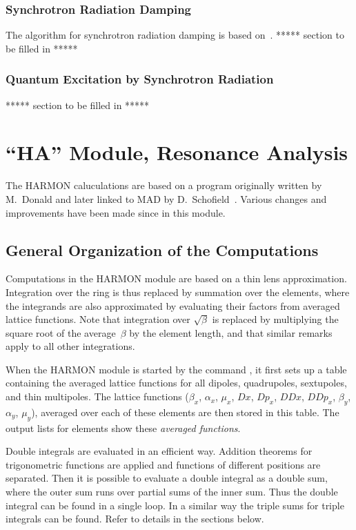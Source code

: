 \subsection{Synchrotron Radiation Damping}
The algorithm for synchrotron radiation damping is based
on~\cite{CHA79}.
***** section to be filled in *****

\subsection{Quantum Excitation by Synchrotron Radiation}
***** section to be filled in *****


\chapter{``HA'' Module, Resonance Analysis}

The HARMON caluculations are based on a program originally written by
M.~Donald and later linked to MAD by D.~Schofield~\cite{DON82}.
Various changes and improvements have been made since in this module.

\section{General Organization of the Computations}
Computations in the HARMON module are based on a thin lens
approximation.
Integration over the ring is thus replaced by summation over the
elements, where the integrands are also approximated by evaluating
their factors from averaged lattice functions.
Note that integration over $\sqrt{\beta}$ is replaced by multiplying
the square root of the average~$\beta$ by the element length,
and that similar remarks apply to all other integrations.

When the HARMON module is started by the command ,
it first sets up a table containing the averaged lattice functions for
all dipoles, quadrupoles, sextupoles, and thin multipoles.
The lattice functions ($\beta_x$, $\alpha_x$, $\mu_x$, $Dx$, $Dp_x$,
$DDx$, $DDp_x$, $\beta_y$, $\alpha_y$, $\mu_y$), averaged over each of
these elements are then stored in this table.
The output lists for elements show these {\em averaged functions}.

Double integrals are evaluated in an efficient way.
Addition theorems for trigonometric functions are applied and
functions of different positions are separated.
Then it is possible to evaluate a double integral as a double sum,
where the outer sum runs over partial sums of the inner sum.
Thus the double integral can be found in a single loop.
In a similar way the triple sums for triple integrals can be found.
Refer to details in the sections below.

